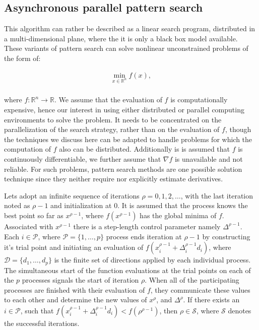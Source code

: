 \subsection{Asynchronous parallel pattern search}\label{BASICUNB:sec:APPS}

This algorithm can rather be described as a linear search program, distributed in a multi-dimensional plane, where the it is only a black box model available. These variants of pattern search can solve nonlinear unconstrained problems of the form of:

\begin{equation}
        \begin{array}{rcl}
            \min_{x\in\mathbb{R}^n}f(x),\\
        \end{array}
        \label{BASICCSR:eqn:currents}
    \end{equation}
		
		where $f:\mathbb{R}^n\longrightarrow\mathbb{R}$. We assume that the evaluation of $f$ is computationally expensive, hence our interest in using either distributed or parallel computing environments to solve the problem. It needs to be concentrated on the parallelization of the search strategy, rather than on the evaluation of $f$, though the techniques we discuss here can be adapted to handle problems for which the computation of $f$ also can be distributed. Additionally is is assumed that $f$ is continuously differentiable, we further assume that $\nabla f$ is unavailable
and not reliable. For such problems, pattern search methods are one possible solution technique since they neither require nor explicitly estimate derivatives.\\


Lets adopt an infinite sequence of iterations $\rho=0,1,2,\dots$, with the last iteration noted as $\rho-1$ and initialization at $0$. It is assumed that the process knows the best point so far as $x^{\rho-1}$, where $f(x^{\rho-1})$ has the global minima of $f$. Associated with $x^{\rho-1}$ there is a step-length control parameter namely $\Delta^{\rho-1}$. Each $i\in\mathcal{P}$, where $\mathcal{P}=\{1,\dots,p\}$ process ends iteration at $\rho-1$ by constructing it's trial point and initiating an evaluation of $f(x^{\rho-1}_i+\Delta^{\rho-1}_id_i)$, where $\mathcal{D}=\{d_1,\dots,d_p\}$ is the finite set of directions applied by each individual process. The simultaneous start of the function evaluations at the trial points on each of the $p$ processes signals the start of iteration $\rho$. When all of the participating processes are finished with their evaluation of $f$, they communicate these values to each other and determine the new values of $x^\rho$, and $\Delta^\rho$. If there exists an $i\in\mathcal{P}$, such that $f(x^{\rho-1}_i+\Delta^{\rho-1}_id_i)<f(\rho^{\rho-1})$, then $\rho\in\mathcal{S}$, where $\mathcal{S}$ denotes the successful iterations.

